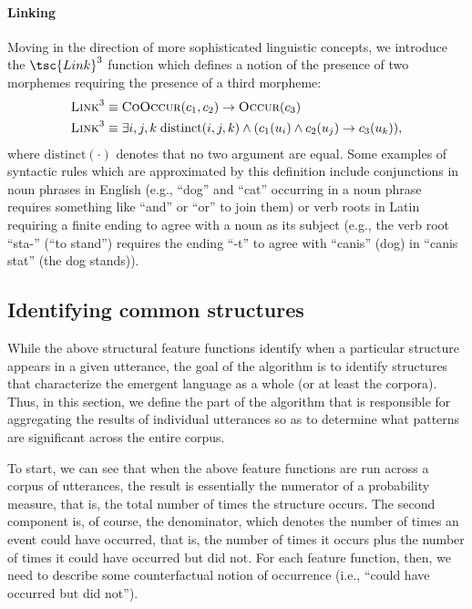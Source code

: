 \paragraph{Linking}
Moving in the direction of more sophisticated linguistic concepts, we introduce the $\tsc{Link}^3$ function which defines a notion of the presence of two morphemes requiring the presence of a third morpheme:
\begin{align}
  \textsc{Link}^3 &\equiv \textsc{CoOccur}(c_1, c_2) \rightarrow \textsc{Occur}(c_3) \\
  \textsc{Link}^3 &\equiv \exists i,j,k \;
    \text{distinct}(i,j,k) \wedge
    (c_1(u_i)\wedge c_2(u_j) \rightarrow c_3(u_k))
  ,
\end{align}
where $\text{distinct}(\cdot)$ denotes that no two argument are equal.
Some examples of syntactic rules which are approximated by this definition include conjunctions in noun phrases in English (e.g., ``dog'' and ``cat'' occurring in a noun phrase requires something like ``and'' or ``or'' to join them)
  or verb roots in Latin requiring a finite ending to agree with a noun as its subject (e.g., the verb root ``sta-'' (``to stand'') requires the ending ``-t'' to agree with ``canis''  (dog) in ``canis stat'' (the dog stands)).



\subsection{Identifying common structures}

While the above structural feature functions identify when a particular structure appears in a given utterance, the goal of the algorithm is to identify structures that characterize the emergent language as a whole (or at least the corpora).
Thus, in this section, we define the part of the algorithm that is responsible for aggregating the results of individual utterances so as to determine what patterns are significant across the entire corpus.

To start, we can see that when the above feature functions are run across a corpus of utterances, the result is essentially the numerator of a probability measure, that is, the total number of times the structure occurs.
The second component is, of course, the denominator, which denotes the number of times an event could have occurred, that is, the number of times it occurs plus the number of times it could have occurred but did not.
For each feature function, then, we need to describe some counterfactual notion of occurrence (i.e., ``could have occurred but did not'').



